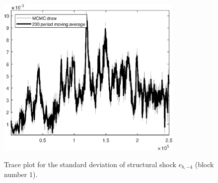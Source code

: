 \begin{figure}[H]
\centering
  \includegraphics[width=0.8\textwidth]{BRS_aggregate/graphs/TracePlot_SE_e_b_news_blck_1}\\
    \caption{Trace plot for the standard deviation of structural shock ${e_{b,-4}}$ (block number 1).}
\end{figure}
